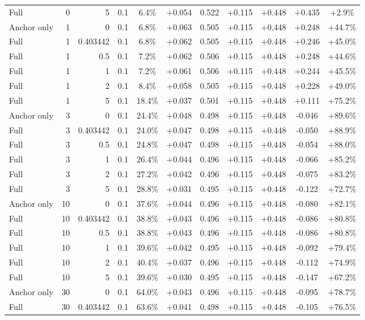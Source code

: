 \begin{table}[htbp]
\begin{tabular}{lrrrccccccc}
Full & 0 & 5 & 0.1 & 6.4\% & +0.054 & 0.522 & +0.115 & +0.448 & +0.435 & +2.9\% \\
Anchor only & 1 & 0 & 0.1 & 6.8\% & +0.063 & 0.505 & +0.115 & +0.448 & +0.248 & +44.7\% \\
Full & 1 & 0.403442 & 0.1 & 6.8\% & +0.062 & 0.505 & +0.115 & +0.448 & +0.246 & +45.0\% \\
Full & 1 & 0.5 & 0.1 & 7.2\% & +0.062 & 0.506 & +0.115 & +0.448 & +0.248 & +44.6\% \\
Full & 1 & 1 & 0.1 & 7.2\% & +0.061 & 0.506 & +0.115 & +0.448 & +0.244 & +45.5\% \\
Full & 1 & 2 & 0.1 & 8.4\% & +0.058 & 0.505 & +0.115 & +0.448 & +0.228 & +49.0\% \\
Full & 1 & 5 & 0.1 & 18.4\% & +0.037 & 0.501 & +0.115 & +0.448 & +0.111 & +75.2\% \\
Anchor only & 3 & 0 & 0.1 & 24.4\% & +0.048 & 0.498 & +0.115 & +0.448 & -0.046 & +89.6\% \\
Full & 3 & 0.403442 & 0.1 & 24.0\% & +0.047 & 0.498 & +0.115 & +0.448 & -0.050 & +88.9\% \\
Full & 3 & 0.5 & 0.1 & 24.8\% & +0.047 & 0.498 & +0.115 & +0.448 & -0.054 & +88.0\% \\
Full & 3 & 1 & 0.1 & 26.4\% & +0.044 & 0.496 & +0.115 & +0.448 & -0.066 & +85.2\% \\
Full & 3 & 2 & 0.1 & 27.2\% & +0.042 & 0.496 & +0.115 & +0.448 & -0.075 & +83.2\% \\
Full & 3 & 5 & 0.1 & 28.8\% & +0.031 & 0.495 & +0.115 & +0.448 & -0.122 & +72.7\% \\
Anchor only & 10 & 0 & 0.1 & 37.6\% & +0.044 & 0.496 & +0.115 & +0.448 & -0.080 & +82.1\% \\
Full & 10 & 0.403442 & 0.1 & 38.8\% & +0.043 & 0.496 & +0.115 & +0.448 & -0.086 & +80.8\% \\
Full & 10 & 0.5 & 0.1 & 38.8\% & +0.043 & 0.496 & +0.115 & +0.448 & -0.086 & +80.8\% \\
Full & 10 & 1 & 0.1 & 39.6\% & +0.042 & 0.495 & +0.115 & +0.448 & -0.092 & +79.4\% \\
Full & 10 & 2 & 0.1 & 40.4\% & +0.037 & 0.496 & +0.115 & +0.448 & -0.112 & +74.9\% \\
Full & 10 & 5 & 0.1 & 39.6\% & +0.030 & 0.495 & +0.115 & +0.448 & -0.147 & +67.2\% \\
Anchor only & 30 & 0 & 0.1 & 64.0\% & +0.043 & 0.496 & +0.115 & +0.448 & -0.095 & +78.7\% \\
Full & 30 & 0.403442 & 0.1 & 63.6\% & +0.041 & 0.498 & +0.115 & +0.448 & -0.105 & +76.5\% \\

\end{tabular}
\end{table}
